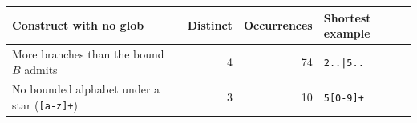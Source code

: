 \begin{tabular}{@{}lrrl@{}}
\toprule
Construct with no glob & Distinct & Occurrences & Shortest example \\
\midrule
More branches than the bound $B$ admits & 4 & 74 & \texttt{2..|5..} \\
No bounded alphabet under a star (\texttt{[a-z]+}) & 3 & 10 & \texttt{5[0-9]+} \\
\bottomrule
\end{tabular}
